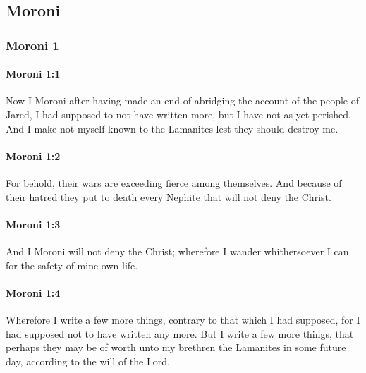 \subsection{Moroni}
	\label{MORONI}

	\subsubsection{Moroni 1} %
		\label{MORONI-1}
		
		\paragraph{Moroni 1:1} %
			\label{MORONI-1-1}

			Now I Moroni after having made an end of abridging
			the account of the people of Jared,
			I had supposed to not have written more,
			but I have not as yet perished.
			And I make not myself known to the Lamanites
			lest they should destroy me.

		\paragraph{Moroni 1:2} %
			\label{MORONI-1-2}

			For behold, their wars are exceeding fierce among themselves.
			And because of their hatred
			they put to death every Nephite that will not deny the Christ.

		\paragraph{Moroni 1:3} %
			\label{MORONI-1-3}

			And I Moroni will not deny the Christ;
			wherefore I wander whithersoever I can for the safety of mine own life.

		\paragraph{Moroni 1:4} %
			\label{MORONI-1-4}

			Wherefore I write a few more things,
			contrary to that which I had supposed,
			for I had supposed not to have written any more.
			But I write a few more things,
			that perhaps they may be of worth
			unto my brethren the Lamanites in some future day,
			according to the will of the Lord.

